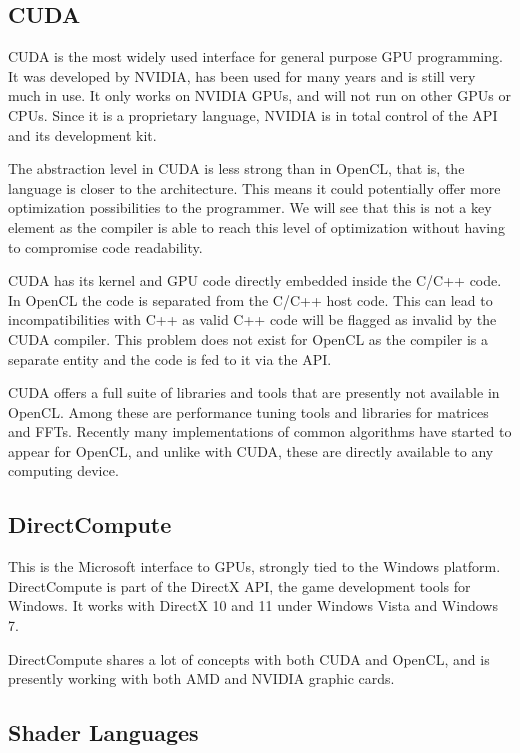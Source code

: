 \subsection{CUDA}

\Gls{CUDA} is the most widely used interface for general purpose \gls{GPU} programming. It was developed by NVIDIA, has been used for many years and is still very much in use. It only works on NVIDIA \glspl{GPU}, and will not run on other \glspl{GPU} or \glspl{CPU}. Since it is a proprietary language, NVIDIA is in total control of the API and its development kit.

The abstraction level in \gls{CUDA} is less strong than in \gls{OpenCL}, that is, the language is closer to the architecture. This means it could potentially offer more optimization possibilities to the programmer. We will see that this is not a key element as the compiler is able to reach this level of optimization without having to compromise code readability.

\Gls{CUDA} has its kernel and \gls{GPU} code directly embedded inside the C/C++ code. In \gls{OpenCL} the code is separated from the C/C++ host code. This can lead to incompatibilities with C++ as valid C++ code will be flagged as invalid by the \gls{CUDA} compiler. This problem does not exist for \gls{OpenCL} as the compiler is a separate entity and the code is fed to it via the \gls{API}. 

\Gls{CUDA} offers a full suite of libraries and tools that are presently not available in \gls{OpenCL}. Among these are performance tuning tools and libraries for matrices and \glspl{FFT}. Recently many implementations of common algorithms have started to appear for \gls{OpenCL}, and unlike with \gls{CUDA}, these are directly available to any computing device.

\subsection{DirectCompute}

This is the Microsoft interface to \glspl{GPU}, strongly tied to the Windows platform. DirectCompute is part of the DirectX API, the game development tools for Windows. It works with DirectX 10 and 11 under Windows Vista and Windows 7. 

DirectCompute shares a lot of concepts with both \gls{CUDA} and \gls{OpenCL}, and is presently working with both AMD and NVIDIA graphic cards.

\subsection{Shader Languages}

